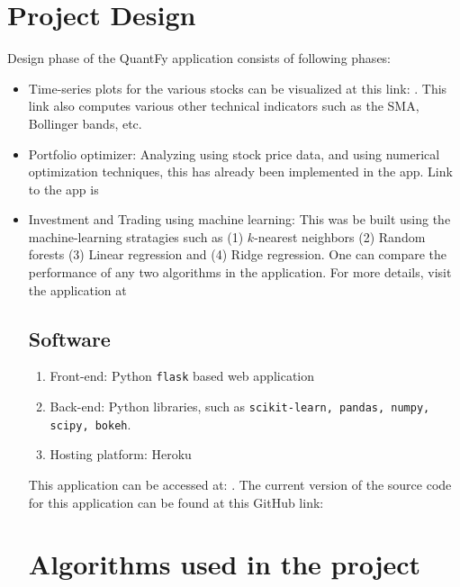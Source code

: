 \documentclass[12pt]{article}
\begin{document}
\section{Project Design}
\label{sec:design}


Design phase of the QuantFy application consists of following phases:
\begin{itemize}
\item Time-series plots for the various stocks can be visualized at this link: \href{http://quantfy.herokuapp.com/price_plot}{\color{blue}{Price plot}} \cite{pp}. This link also computes various other technical indicators such as the SMA, Bollinger bands, etc.
\item Portfolio optimizer: Analyzing using stock price data, and using numerical optimization techniques, this has already been implemented in the app. Link to the app is \href{http://quantfy.herokuapp.com/portfolio}{\color{blue}{\bf Portfolio optimizer}} \cite{po}

\item Investment and Trading using machine learning: This was be built using the machine-learning stratagies such as (1) $k$-nearest neighbors (2) Random forests (3) Linear regression  and (4) Ridge regression. One can compare the performance of any two algorithms in the application. For more details, visit the application at \href{http://quantfy.herokuapp.com/mlModels}{\color{blue}{\bf ML models}}

\subsection{Software}
\begin{enumerate}
\item Front-end: Python \texttt{flask} based web application
\item Back-end: Python libraries, such as \texttt{scikit-learn, pandas, numpy, scipy, bokeh}.
\item Hosting platform: Heroku
\end{enumerate}

This  application can be accessed at: \href{http://quantfy.herokuapp.com}{\color{blue}{\bf QuantFy}} \cite{qfy}. The current version of the source code for this application can be found at this GitHub link: \href{https://github.com/beegeesquare/QuantFy}{\color{blue}{\bf Source code}} \cite{sc}



\section{Algorithms used in the project}
\label{sec:algos}


\end{itemize}
\end{document}
